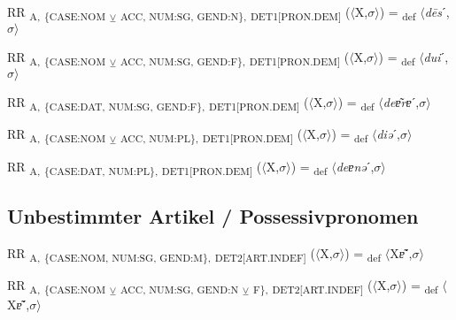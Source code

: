 {\begin{exe}
 RR \textsubscript{A,} \textsubscript{\{CASE:NOM} \textsubscript{${\veebar}$}\textsubscript{ ACC, NUM:SG, GEND:N\},} \textsubscript{DET1[PRON.DEM]} ($\langle$X,$\sigma $$\rangle$) = \textsubscript{def} $\langle$\textit{d\=es}ˊ,$\sigma $$\rangle$
\end{exe}

\begin{exe}
 RR \textsubscript{A,} \textsubscript{\{CASE:NOM} \textsubscript{${\veebar}$}\textsubscript{ ACC, NUM:SG, GEND:F\},} \textsubscript{DET1[PRON.DEM]} ($\langle$X,$\sigma $$\rangle$) = \textsubscript{def} $\langle$\textit{dui}ˊ,$\sigma $$\rangle$
\end{exe}

\begin{exe}
 RR \textsubscript{A,} \textsubscript{\{CASE:DAT, NUM:SG, GEND:F\},} \textsubscript{DET1[PRON.DEM]} ($\langle$X,$\sigma $$\rangle$) = \textsubscript{def} $\langle$\textit{deɐ͂rɐ}ˊ,$\sigma $$\rangle$
\end{exe}

\begin{exe}
 RR \textsubscript{A,} \textsubscript{\{CASE:NOM} \textsubscript{${\veebar}$}\textsubscript{ ACC, NUM:PL\},} \textsubscript{DET1[PRON.DEM]} ($\langle$X,$\sigma $$\rangle$) = \textsubscript{def} $\langle$\textit{diə}ˊ,$\sigma $$\rangle$
\end{exe}

\begin{exe}
 RR \textsubscript{A,} \textsubscript{\{CASE:DAT, NUM:PL\},} \textsubscript{DET1[PRON.DEM]} ($\langle$X,$\sigma $$\rangle$) = \textsubscript{def} $\langle$\textit{deɐnə}ˊ,$\sigma $$\rangle$
\end{exe}

\subsection{Unbestimmter Artikel / Possessivpronomen}

\begin{exe}
 RR \textsubscript{A,} \textsubscript{\{CASE:NOM, NUM:SG, GEND:M\},} \textsubscript{DET2[ART.INDEF]} ($\langle$X,$\sigma $$\rangle$) = \textsubscript{def} $\langle$X\textit{ɐ͂}ˊ,$\sigma $$\rangle$
\end{exe}

\begin{exe}
 RR \textsubscript{A,} \textsubscript{\{CASE:NOM} \textsubscript{${\veebar}$}\textsubscript{ ACC, NUM:SG, GEND:N} \textsubscript{${\veebar}$}\textsubscript{ F\},} \textsubscript{DET2[ART.INDEF]} ($\langle$X,$\sigma $$\rangle$) = \textsubscript{def} $\langle$X\textit{ɐ͂}ˊ,$\sigma $$\rangle$
\end{exe}

}
